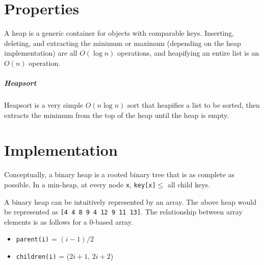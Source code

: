 \documentclass[11pt]{article}
\begin{document}
\section{Properties}
	A heap is a generic container for objects with comparable keys. Inserting, deleting, and extracting the minimum or maximum (depending on the heap implementation) are all $O(\log n)$ operations, and heapifying an entire list is an $O(n)$ operation.
	
	\subparagraph{Heapsort} Heapsort is a very simple $O(n\log n)$ sort that heapifies a list to be sorted, then extracts the minimum from the top of the heap until the heap is empty.
	
\section{Implementation}
	Conceptually, a binary heap is a rooted binary tree that is as complete as possible. In a min-heap, at every node \verb|x|, \verb|key[x]|$\leq$ all child keys.
	
	\begin{center}
	\end{center}
	A binary heap can be intuitively represented by an array. The above heap would be represented as \verb|[4 4 8 9 4 12 9 11 13]|. The relationship between array elements is as follows for a 0-based array.
	\begin{itemize}
		\item \verb|parent(i)| = $(i-1)/2$
		\item \verb|children(i)| = ($2i + 1$, $2i + 2$)
	\end{itemize}
	
\end{document}
